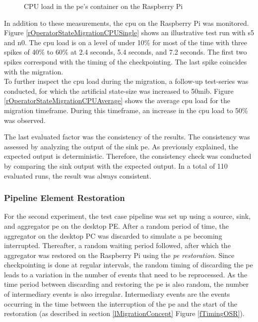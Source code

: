 \begin{figure}[!ht]
    \centering
    \caption{CPU load in the \gls{pe}'s container on the Raspberry Pi}%
    \label{rOperatorStateMigrationCPU}%
\end{figure}


In addition to these measurements, the \gls{cpu} on the Raspberry Pi was monitored. Figure \ref{rOperatorStateMigrationCPUSingle} shows an illustrative test run with s5 and n0. The \gls{cpu} load is on a level of under 10\% for most of the time with three spikes of 40\% to 60\% at 2.4 seconds, 5.4 seconds, and 7.2 seconds. The first two spikes correspond with the timing of the checkpointing. The last spike coincides with the migration.\\
To further inspect the \gls{cpu} load during the migration, a follow-up test-series was conducted, for which the artificial state-size was increased to 50\gls{mib}. Figure \ref{rOperatorStateMigrationCPUAverage} shows the average \gls{cpu} load for the migration timeframe. During this timeframe, an increase in the \gls{cpu} load to 50\% was observed.\par

The last evaluated factor was the consistency of the results. The consistency was assessed by analyzing the output of the sink \gls{pe}. As previously explained, the expected output is deterministic. Therefore, the consistency check was conducted by comparing the sink output with the expected output. In a total of 110 evaluated runs, the result was always consistent. 

\subsubsection{Pipeline Element Restoration}
\label{lResultsOperatorStateRestoration}
For the second experiment, the test case pipeline was set up using a source, sink, and aggregator \gls{pe} on the desktop PE. After a random period of time, the aggregator on the desktop PC was discarded to simulate a \gls{pe} becoming interrupted. Thereafter, a random waiting period followed, after which the aggregator was restored on the Raspberry Pi using the \textit{\acrshort{pe} restoration}. Since checkpointing is done at regular intervals, the random timing of discarding the \gls{pe} leads to a variation in the number of events that need to be reprocessed. As the time period between discarding and restoring the \gls{pe} is also random, the number of intermediary events is also irregular. Intermediary events are the events occurring in the time between the interruption of the \gls{pe} and the start of the restoration (as described in section \ref{lMigrationConcept} Figure \ref{fTimingOSR}).\par

